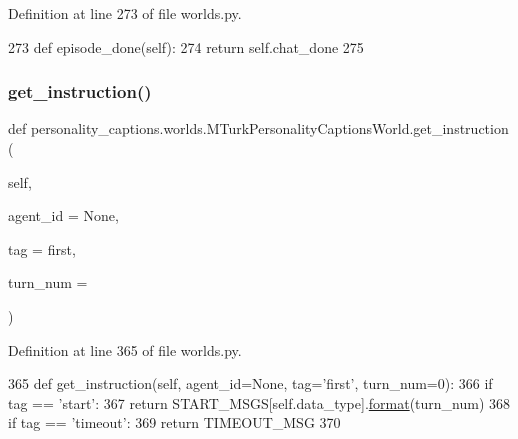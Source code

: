 Definition at line 273 of file worlds.\+py.


\begin{DoxyCode}
273     \textcolor{keyword}{def }episode\_done(self):
274         \textcolor{keywordflow}{return} self.chat\_done
275 
\end{DoxyCode}
\mbox{\label{classpersonality__captions_1_1worlds_1_1MTurkPersonalityCaptionsWorld_a4e9a57d65cc93af5741f56597a970618}} 
\subsubsection{\texorpdfstring{get\+\_\+instruction()}{get\_instruction()}}
{\footnotesize\ttfamily def personality\+\_\+captions.\+worlds.\+M\+Turk\+Personality\+Captions\+World.\+get\+\_\+instruction (\begin{DoxyParamCaption}\item[{}]{self,  }\item[{}]{agent\+\_\+id = {\ttfamily None},  }\item[{}]{tag = {\ttfamily \textquotesingle{}first\textquotesingle{}},  }\item[{}]{turn\+\_\+num = {} }\end{DoxyParamCaption})}



Definition at line 365 of file worlds.\+py.


\begin{DoxyCode}
365     \textcolor{keyword}{def }get\_instruction(self, agent\_id=None, tag='first', turn\_num=0):
366         \textcolor{keywordflow}{if} tag == \textcolor{stringliteral}{'start'}:
367             \textcolor{keywordflow}{return} START\_MSGS[self.data\_type].\hyperlink{namespaceparlai_1_1chat__service_1_1services_1_1messenger_1_1shared__utils_a32e2e2022b824fbaf80c747160b52a76}{format}(turn\_num)
368         \textcolor{keywordflow}{if} tag == \textcolor{stringliteral}{'timeout'}:
369             \textcolor{keywordflow}{return} TIMEOUT\_MSG
370 
\end{DoxyCode}
\mbox{\label{classpersonality__captions_1_1worlds_1_1MTurkPersonalityCaptionsWorld_ab682688b0f65bc5162cb77f3d96fafc4}} 
